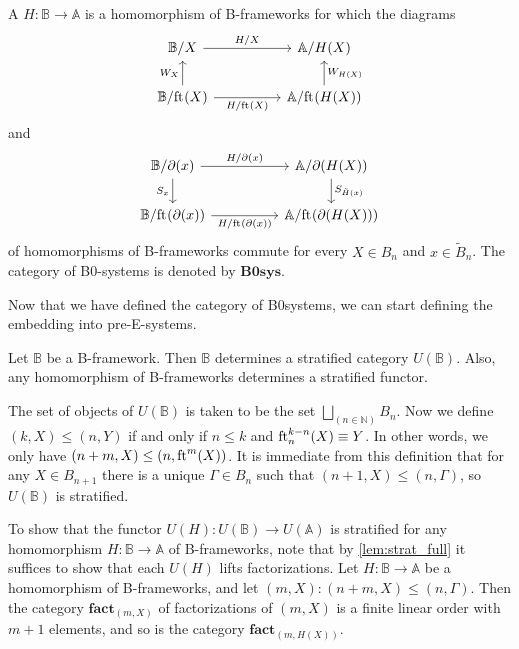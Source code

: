 \begin{defn}
A  $H:\mathbb{B}\to\mathbb{A}$ is a homomorphism of B-frameworks
for which the diagrams
\begin{equation*}
\begin{tikzcd}[column sep=huge]
\mathbb{B}/X \arrow[r,"H/X"] & \mathbb{A}/H(X) \\
\mathbb{B}/\eft(X) \arrow[u,"W_X"] \arrow[r,swap,"H/\eft(X)"] & \mathbb{A}/\eft(H(X)) \arrow[u,swap,"W_{H(X)}"]
\end{tikzcd}
\end{equation*}
and
\begin{equation*}
\begin{tikzcd}[column sep=huge]
\mathbb{B}/\ebd(x) \arrow[r,"H/\ebd(x)"] \arrow[d,swap,"S_x"] & \mathbb{A}/\ebd(H(X)) \arrow[d,"S_{\tilde{H}(x)}"] \\
\mathbb{B}/\eft(\ebd(x)) \arrow[r,swap,"H/\eft(\ebd(x))"] & \mathbb{A}/\eft(\ebd(H(X)))
\end{tikzcd}
\end{equation*}
of homomorphisms of B-frameworks commute for every 
$X\in B_n$ and $x\in\tilde{B}_n$. The category of B0-systems is denoted
by $\mathbf{B0sys}$.
\end{defn}

Now that we have defined the category of B0systems, we can start defining the
embedding into pre-E-systems.

\begin{defn}
Let $\mathbb{B}$ be a B-framework. Then $\mathbb{B}$ determines
a stratified category $U(\mathbb{B})$. Also, any homomorphism of B-frameworks
determines a stratified functor.
\end{defn}

\begin{constr}
The set of objects of $U(\mathbb{B})$ is taken to be the set
$\bigsqcup_{(n\in\mathbb{N})}B_n$. Now we define
$(k,X)\leq (n,Y)$ if and only if $n\leq k$ and $\eft[n]^{k-n}(X)\jdeq Y$.
In other words, we only have $(n+m,X)\leq (n,\eft^m(X))$. It is immediate from
this definition that for any $X\in B_{n+1}$ there is a unique $\Gamma\in
B_n$ such that $(n+1,X)\leq (n,\Gamma)$, so $U(\mathbb{B})$ is stratified.

To show that the functor $U(H):U(\mathbb{B})\to U(\mathbb{A})$ is stratified for
any homomorphism $H:\mathbb{B}\to\mathbb{A}$ of B-frameworks, note that
by \autoref{lem:strat_full} it suffices to show that each $U(H)$ 
lifts factorizations.
Let $H:\mathbb{B}\to\mathbb{A}$ be a homomorphism of B-frameworks, and let
$(m,X):(n+m,X)\leq (n,\Gamma)$. Then the category $\mathbf{fact}_{(m,X)}$ of
factorizations of $(m,X)$ is a finite linear order with
$m+1$ elements, and so is the category $\mathbf{fact}_{(m,H(X))}$. 
\end{constr}

